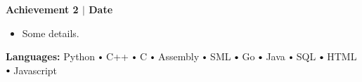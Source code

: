 \documentclass[10pt]{article}
\newcommand\sbullet[1][.5]{\mathbin{\vcenter{\hbox{\scalebox{#1}{$\bullet$}}}}}
\begin{document}
  \textbf{\large {Achievement 2} $\mid$ Date} 
  \vspace*{-0.17cm}
  \begin{itemize}
    \itemsep0em
    \item \textcolor{lighterG}{Some details.}
  \end{itemize}

  \textbf{\large {Languages:}}
    Python $\sbullet[.75]$ 
    C++ $\sbullet[.75]$
    C $\sbullet[.75]$ 
    Assembly $\sbullet[.75]$ 
    SML $\sbullet[.75]$ 
    Go $\sbullet[.75]$ 
    Java $\sbullet[.75]$
    SQL $\sbullet[.75]$ 
    HTML $\sbullet[.75]$ 
    Javascript
\end{document}
